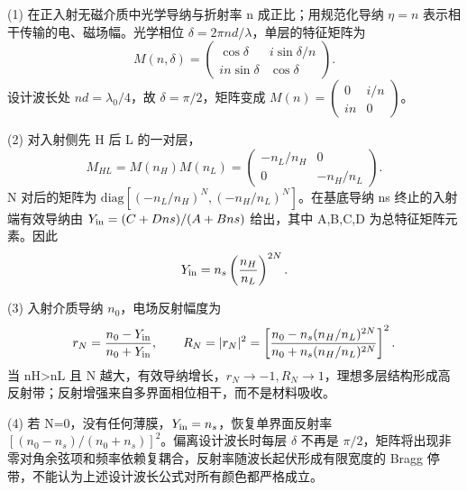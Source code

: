 (1) 在正入射无磁介质中光学导纳与折射率 n 成正比；用规范化导纳 \(\eta =n\) 表示相干传输的电、磁场幅。光学相位 \(\delta =2\pi nd/\lambda \)，单层的特征矩阵为
\[
M(n,\delta)=\begin{pmatrix}
\cos\delta&i\sin\delta/n\\ i n\sin\delta&\cos\delta
\end{pmatrix}.
\]
设计波长处 \(nd=\lambda _{0}/4\)，故 \(\delta =\pi /2\)，矩阵变成 \(M(n)=\begin{pmatrix}0&i/n\\in&0\end{pmatrix}\)。

(2) 对入射侧先 H 后 L 的一对层，
\[
M_{HL}=M(n_H)M(n_L)
=\begin{pmatrix}-n_L/n_H&0\\0&-n_H/n_L\end{pmatrix}.
\]
N 对后的矩阵为 \(\mathrm{diag}[(-n_L/n_H)^N,(-n_H/n_L)^N]\)。在基底导纳 ns 终止的入射端有效导纳由 \(Y_{\rm in}=(C+Dns)/(A+Bns)\) 给出，其中 A,B,C,D 为总特征矩阵元素。因此
\[
Y_{\rm in}=n_s\left(\frac{n_H}{n_L}\right)^{2N}.
\]

(3) 入射介质导纳 \(n_{0}\)，电场反射幅度为
\[
r_N=\frac{n_0-Y_{\rm in}}{n_0+Y_{\rm in}},\qquad
R_N=|r_N|^2=
\left[\frac{n_0-n_s(n_H/n_L)^{2N}}
{n_0+n_s(n_H/n_L)^{2N}}\right]^2.
\]
当 nH>nL 且 N 越大，有效导纳增长，\(r_N\to-1,R_N\to1\)，理想多层结构形成高反射带；反射增强来自多界面相位相干，而不是材料吸收。

(4) 若 N=0，没有任何薄膜，\(Y_{\rm in}=n_s\)，恢复单界面反射率 \([(n_0-n_s)/(n_0+n_s)]^2\)。偏离设计波长时每层 \(\delta \) 不再是 \(\pi /2\)，矩阵将出现非零对角余弦项和频率依赖复耦合，反射率随波长起伏形成有限宽度的 Bragg 停带，不能认为上述设计波长公式对所有颜色都严格成立。
